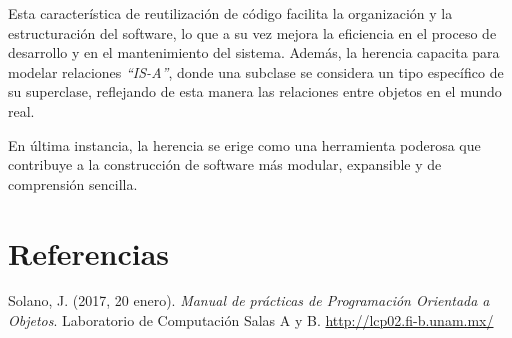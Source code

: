 \documentclass[11pt, twocolumn]{article}
\begin{document}
  Esta característica de reutilización de código facilita la organización y la estructuración del software, lo que a su vez mejora la eficiencia en el proceso de desarrollo y en el mantenimiento del sistema. Además, la herencia capacita para modelar relaciones \textit{``IS-A''}, donde una subclase se considera un tipo específico de su superclase, reflejando de esta manera las relaciones entre objetos en el mundo real. 
  
  En última instancia, la herencia se erige como una herramienta poderosa que contribuye a la construcción de software más modular, expansible y de comprensión sencilla.

  \section*{Referencias}
  \small
  Solano, J. (2017, 20 enero). \textit{Manual de prácticas de Programación Orientada a Objetos}. Laboratorio de Computación Salas A y B. \url{http://lcp02.fi-b.unam.mx/} \\

  
\end{document}
